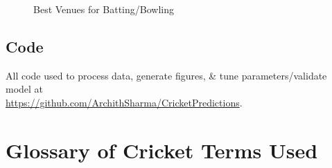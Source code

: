 \documentclass{article}[12pt]
\begin{document}
\begin{appendices}
\begin{figure}[!htb]
    \centering
    \qquad
    \caption{Best Venues for Batting/Bowling}%
    \label{fig:venues}%
\end{figure}
\subsection{Code}
\label{appendix:vis1}
All code used to process data, generate figures, \& tune parameters/validate model at \\ \href{https://github.com/ArchithSharma/CricketPredictions}{https://github.com/ArchithSharma/CricketPredictions}. 
\clearpage
\section{Glossary of Cricket Terms Used}

\label{appendix:terms}



\end{appendices}
\end{document}
